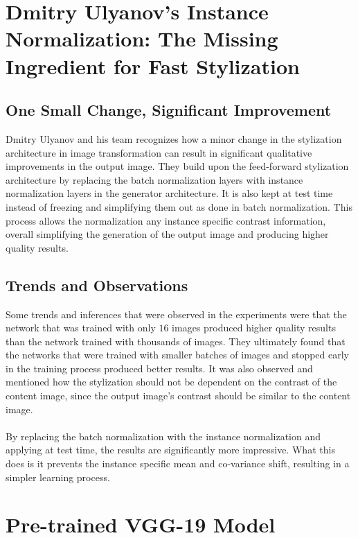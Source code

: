 \documentclass[12pt]{article}
\begin{document}

\section{Dmitry Ulyanov’s Instance Normalization: The Missing Ingredient for Fast Stylization}

\subsection{One Small Change, Significant Improvement}
Dmitry Ulyanov and his team recognizes how a minor change in the stylization architecture in image transformation can result in significant qualitative improvements in the output image. They build upon the feed-forward stylization architecture by replacing the batch normalization  layers with instance normalization layers in the generator architecture. It is also kept at test time instead of freezing and simplifying them out as done in batch normalization. This process allows the normalization any instance specific contrast information, overall simplifying the generation of the output image and producing higher quality results.

\subsection{Trends and Observations}
Some trends and inferences that were observed in the experiments were that the network that was trained with only $16$ images produced higher quality results than the network trained with thousands of images. They ultimately found that the networks that were trained with smaller batches of images and stopped early in the training process produced better results. It was also observed and mentioned how the stylization should not be dependent on the contrast of the content image, since the output image's contrast should be similar to the content image.\cite{Ulyanov}
\\\\
By replacing the batch normalization with the instance normalization and applying at test time, the results are significantly more impressive. What this does is it prevents the instance specific mean and co-variance shift, resulting in a simpler learning process. \cite{Ulyanov}




\section{Pre-trained VGG-19 Model}
\end{document}
